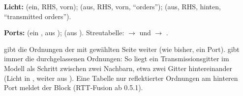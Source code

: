 \textbf{Licht:}  (ein, RHS, vorn);  (aus, RHS, vorn, \enquote{orders});
 (aus, RHS, hinten, \enquote{transmitted orders}).

\textbf{Ports:}  (ein , aus );  (aus ).
Streutabelle:  $\to$  und  $\to$ .

 gibt die Ordnungen der mit  gewählten Seite weiter (wie bisher, ein
Port).  gibt immer die durchgelassenen Ordnungen: So liegt ein
Transmissionsgitter im Modell als Schritt zwischen zwei Nachbarn, etwa zwei Gitter hintereinander
(Licht in , weiter aus ). Eine Tabelle nur reflektierter Ordnungen am
hinteren Port meldet der Block (RTT-Fusion ab 0.5.1).

